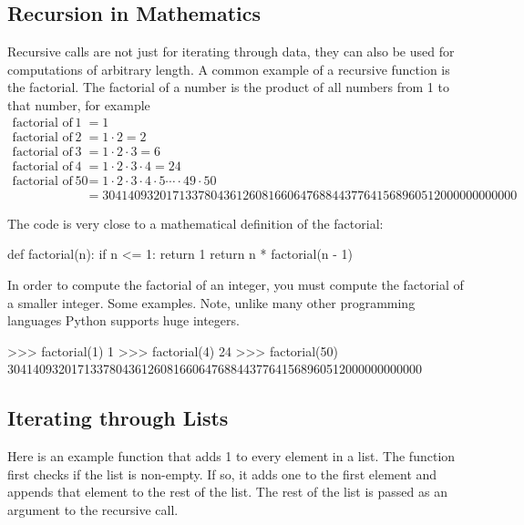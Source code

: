 \documentclass[11pt]{cselabheader}
\begin{document}
\subsection{Recursion in Mathematics}
Recursive calls are not just for iterating through data, they can also be used
for computations of arbitrary length. A common example of a recursive function
is the factorial. The factorial of a number is the product of all numbers from
1 to that number, for example
\begin{align*}
\text{factorial of } 1 &= 1
\\
\text{factorial of } 2 &= 1 \cdot 2 = 2
\\
\text{factorial of } 3 &= 1 \cdot 2 \cdot 3 = 6
\\
\text{factorial of } 4 &= 1 \cdot 2 \cdot 3 \cdot 4 = 24
\\
\text{factorial of } 50 &= 1 \cdot 2 \cdot 3 \cdot 4 \cdot 5
                         \dotsb \cdot 49 \cdot 50
\\ &= 30414093201713378043612608166064768844377641568960512000000000000
\end{align*}

The code is very close to a mathematical definition of the factorial:

\begin{python3code}
def factorial(n):
    if n <= 1:
        return 1
    return n * factorial(n - 1)
\end{python3code}

In order to compute the factorial of an integer, you must compute the
factorial of a smaller integer. Some examples. Note, unlike many other programming languages Python
supports huge integers.

\begin{pyconcode}
>>> factorial(1)
1
>>> factorial(4)
24
>>> factorial(50)
30414093201713378043612608166064768844377641568960512000000000000
\end{pyconcode}

\subsection{Iterating through Lists}

Here is an example function that adds 1 to every element in a list.
The function first checks if the list is non-empty. If so, it adds
one to the first element and appends that element to the rest of
the list. The rest of the list is passed as an argument to the
recursive call.
\end{document}
